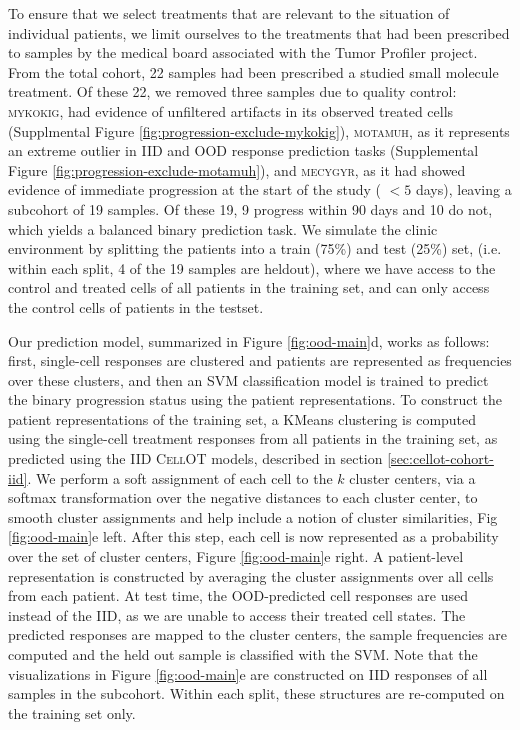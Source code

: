 To ensure that we select treatments that are relevant to the situation of individual patients, we limit ourselves to the treatments that had been prescribed to samples by the medical board associated with the Tumor Profiler project.
From the total cohort, 22 samples had been prescribed a studied small molecule treatment.
Of these 22, we removed three samples due to quality control: \textsc{mykokig}, had evidence of unfiltered artifacts in its observed treated cells (Supplmental Figure \ref{fig:progression-exclude-mykokig}), \textsc{motamuh}, as it represents an extreme outlier in IID and OOD response prediction tasks (Supplemental Figure \ref{fig:progression-exclude-motamuh}), and \textsc{mecygyr}, as it had showed evidence of immediate progression at the start of the study ( $< 5$ days), leaving a subcohort of 19 samples.
Of these 19, 9 progress within 90 days and 10 do not, which yields a balanced binary prediction task.
We simulate the clinic environment by splitting the patients into a train (75\%) and test (25\%) set, (i.e. within each split, 4 of the 19 samples are heldout), where we have access to the control and treated cells of all patients in the training set, and can only access the control cells of patients in the testset.

Our prediction model, summarized in Figure \ref{fig:ood-main}d, works as follows: first, single-cell responses are clustered and patients are represented as frequencies over these clusters, and then an SVM classification model is trained to predict the binary progression status using the patient representations.
To construct the patient representations of the training set, a KMeans clustering is computed using the single-cell treatment responses from all patients in the training set, as predicted using the IID \textsc{CellOT} models, described in section \ref{sec:cellot-cohort-iid}.
We perform a soft assignment of each cell to the $k$ cluster centers, via a softmax transformation over the negative distances to each cluster center, to smooth cluster assignments and help include a notion of cluster similarities, Fig \ref{fig:ood-main}e left.
After this step, each cell is now represented as a probability over the set of cluster centers, Figure \ref{fig:ood-main}e right.
A patient-level representation is constructed by averaging the cluster assignments over all cells from each patient.
At test time, the OOD-predicted cell responses are used instead of the IID, as we are unable to access their treated cell states.
The predicted responses are mapped to the cluster centers, the sample frequencies are computed and the held out sample is classified with the SVM.
Note that the visualizations in Figure \ref{fig:ood-main}e are constructed on IID responses of all samples in the subcohort.
Within each split, these structures are re-computed on the training set only.

